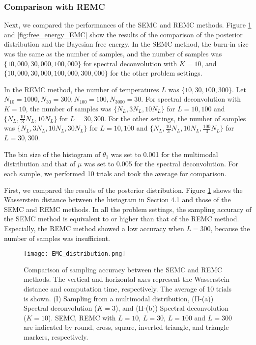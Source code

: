 \documentclass[12pt]{article}
\begin{document}
\subsubsection{Comparison with REMC}
Next, we compared the performances of the SEMC and REMC methods.
Figure \ref{fig:hist_EMC} and \ref{fig:free_energy_EMC} show the results of the comparison of the posterior distribution and the Bayesian free energy.
In the SEMC method, the burn-in size was the same as the number of samples, and the number of samples was $\{10{,}000,30{,}000,100{,}000\}$ for spectral deconvolution with $K=10$, and $\{10{,}000,30{,}000,100{,}000,300{,}000\}$ for the other problem settings. \par
In the REMC method, the number of temperatures $L$ was $\{10,30,100,300\}$. Let $N_{10} = 1000,N_{30} = 300, N_{100} = 100, N_{3000} = 30$.
For spectral deconvolution with $K=10$, the number of samples was $\{N_L,3N_L,10N_L\}$ for $L = 10,100$ and $\{N_L,\frac{10}{3}N_L,10N_L\}$ for $L = 30,300$.
For the other settings, the number of samples was $\{N_L,3N_L,10N_L,30N_L\}$ for $L=10,100$ and $\{N_L,\frac{10}{3}N_L,10N_L, \frac{100}{3}N_L\}$ for $L=30,300$. \par
The bin size of the histogram of $\theta_1$ was set to 0.001 for the multimodal distribution and that of $\mu$ was set to 0.005 for the spectral deconvolution.
For each sample, we performed 10 trials and took the average for comparison. \par
First, we compared the results of the posterior distribution.
Figure \ref{fig:hist_EMC} shows the Wasserstein distance between the histogram in Section 4.1 and those of the SEMC and REMC methods.
In all the problem settings, the sampling accuracy of the SEMC method is equivalent to or higher than that of the REMC method.
Especially, the REMC method showed a low accuracy when $L = 300$, because the number of samples was insufficient. \par
\begin{figure}[h]
  \centering
  \texttt{[image: EMC\_distribution.png]}
  \caption{Comparison of sampling accuracy between the SEMC and REMC methods. The vertical and horizontal axes represent the Wasserstein distance and computation time, respectively. 
  The average of 10 trials is shown. 
  (I) Sampling from a multimodal distribution, (II-(a)) Spectral deconvolution ($K=3$), and (II-(b)) Spectral deconvolution ($K=10$). 
  SEMC, REMC with $L=10$, $L=30$, $L=100$ and $L=300$ are indicated by round, cross, square, inverted triangle, and triangle markers, respectively. }
  \label{fig:hist_EMC}
\end{figure}
\end{document}
